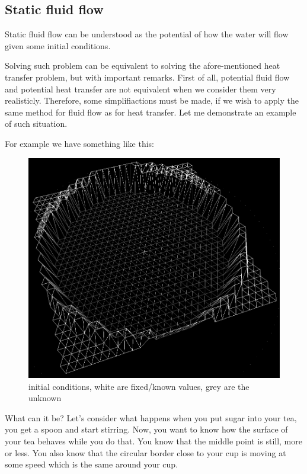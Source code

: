 \documentclass[a4paper,12pt]{article}
\begin{document}
\newpage

\subsection{Static fluid flow}

Static fluid flow can be understood as the potential of how the water will flow given some initial conditions.

Solving such problem can be equivalent to solving the afore-mentioned heat transfer problem, but with important remarks.
First of all, potential fluid flow and potential heat transfer are not equivalent when we consider them very
realisticly. Therefore, some simplifiactions must be made, if we wish to apply the same method for fluid flow as for
heat transfer. Let me demonstrate an example of such situation. 

For example we have something like this:

\begin{figure}[H]
\begin{center}
  \includegraphics[width=\textwidth]{flow_initial}
\end{center}
\caption{initial conditions, white are fixed/known values, grey are the unknown}
\end{figure}

What can it be? Let's consider what happens when you put sugar into your tea, you get a spoon and start stirring. Now,
you want to know how the surface of your tea behaves while you do that. You know that the middle point is still, more or
less. You also know that the circular border close to your cup is moving at some speed which is the same around your cup.
\end{document}
